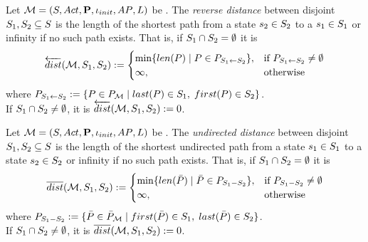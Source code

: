 \documentclass[preview]{standalone}
\begin{document}
\begin{definition}
	Let ${{{\mathcal{M}}}} = {{({S}, {Act}, {\textbf{P}}, {\iota_{init}}, {AP}, {L})}}$ be \achgphN. The \emph{reverse distance} between disjoint ${S}_1, {S}_2 \subseteq {S}$ is the length of the shortest path from a state ${s}_2 \in {S}_2$ to a ${s}_1 \in {S}_1$ or infinity if no such path exists. That is, if ${S}_1 \cap {S}_2 = \emptyset$ it is		
	\[
	{\overleftarrow{dist}}({{{\mathcal{M}}}}, {S}_1, {S}_2) := 
	\begin{cases}
		\min\{{len}({P}) \mid {P} \in P_{{S}_1 \leftarrow {S}_2}\}, &\text{if } P_{{S}_1 \leftarrow {S}_2} \neq \emptyset \\
		\infty, &\text{otherwise}
	\end{cases}
	\]
	where $P_{\states_1 \leftarrow \states_2} := \{\path \in \pathset \mid \plast(\path) \in \states_1, \; \pfirst(\path) \in \states_2\}$. \\
	\noindent
	If ${S}_1 \cap {S}_2 \neq \emptyset$, it is ${\overleftarrow{dist}}({{{\mathcal{M}}}}, {S}_1, {S}_2) := 0$.
\end{definition}

\begin{definition}
	Let ${{{\mathcal{M}}}} = {{({S}, {Act}, {\textbf{P}}, {\iota_{init}}, {AP}, {L})}}$ be \achgphN. The \emph{undirected distance} between disjoint ${S}_1, {S}_2 \subseteq {S}$ is the length of the shortest undirected path from a state ${s}_1 \in {S}_1$ to a state ${s}_2 \in {S}_2$  or infinity if no such path exists. That is, if ${S}_1 \cap {S}_2 = \emptyset$ it is		
	\[
	{\overline{dist}}({{{\mathcal{M}}}}, {S}_1, {S}_2) := 
	\begin{cases}
		\min\{{len}({\bar{{P}}}) \mid {\bar{\ensuremath{{P}}}} \in P_{{S}_1 - {S}_2}\}, &\text{if } P_{{S}_1 - {S}_2} \neq \emptyset \\
		\infty, &\text{otherwise}
	\end{cases}
	\]
	where $P_{\states_1 - \states_2} := \{\pathbi \in \pathbiset \mid \pfirst(\pathbi) \in \states_1, \; \plast(\pathbi) \in \states_2\}$. \\
	\noindent
	If ${S}_1 \cap {S}_2 \neq \emptyset$, it is ${\overline{dist}}({{{\mathcal{M}}}}, {S}_1, {S}_2) := 0$.
\end{definition}
\end{document}
